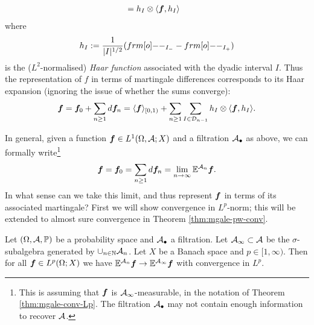\begin{example}
\begin{equation*}
\begin{aligned}
      &= h_I \otimes \langle \bm{f}, h_I \rangle
    \end{aligned}
  \end{equation*}
  where
  \begin{equation*}
    h_I := \frac{1}{|I|^{1/2}} (\1_{I_-} - \1_{I_+})
  \end{equation*}
  is the ($L^2$-normalised) \emph{Haar function} associated with the dyadic interval $I$.
  Thus the representation of $f$ in terms of martingale differences corresponds to its Haar expansion (ignoring the issue of whether the sums converge):
  \begin{equation*}
    \bm{f} = \bm{f}_0 + \sum_{n \geq 1} d\bm{f}_{n} = \langle \bm{f} \rangle_{[0,1)} + \sum_{n \geq 1} \sum_{I \in \mathcal{D}_{n-1}} h_I \otimes \langle \bm{f}, h_I \rangle. 
  \end{equation*}
\end{example}

In general, given a function $\bm{f} \in L^1(\Omega,\mathcal{A};X)$ and a filtration $\mathcal{A}_{\bullet}$ as above, we can formally write\footnote{This is assuming that $\bm{f}$ is $\mathcal{A}_{\infty}$-measurable, in the notation of Theorem \ref{thm:mgale-conv-Lp}. The filtration $\mathcal{A}_{\bullet}$ may not contain enough information to recover $\mathcal{A}$.}
\begin{equation*}
  \bm{f} = \bm{f}_{0} = \sum_{n \geq 1} d\bm{f}_{n} = \lim_{n \to \infty} \mathbb{E}^{\mathcal{A}_{n}} \bm{f}.
\end{equation*}
In what sense can we take this limit, and thus represent $\bm{f}$ in terms of its associated martingale?
First we will show convergence in $L^p$-norm; this will be extended to almost sure convergence in Theorem \ref{thm:mgale-pw-conv}. 

\begin{thm}\label{thm:mgale-conv-Lp}
  Let $(\Omega, \mathcal{A}, \mathbb{P})$ be a probability space and $\mathcal{A}_{\bullet}$ a filtration.
  Let $\mathcal{A}_{\infty} \subset \mathcal{A}$ be the $\sigma$-subalgebra generated by $\cup_{n \in \mathbb{N}} \mathcal{A}_{n}$.
  Let $X$ be a Banach space and $p \in [1,\infty)$.
  Then for all $\bm{f} \in L^p(\Omega;X)$ we have $\mathbb{E}^{\mathcal{A}_{n}} \bm{f} \to \mathbb{E}^{\mathcal{A}_\infty} \bm{f}$ with convergence in $L^p$.
\end{thm}

